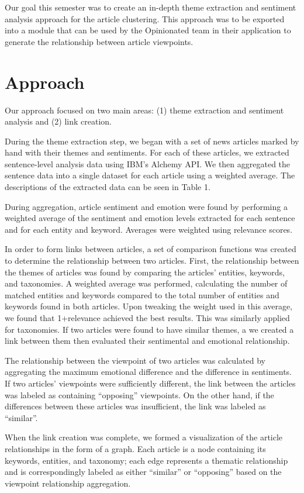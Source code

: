 \documentclass[12pt]{article}
\begin{document}
Our goal this semester was to create an in-depth theme extraction and sentiment analysis approach for the article clustering. This approach was to be exported into a module that can be used by the Opinionated team in their application to generate the relationship between article viewpoints.

\section{Approach}
Our approach focused on two main areas: (1) theme extraction and sentiment analysis and (2) link creation.

During the theme extraction step, we began with a set of news articles marked by hand with their themes and sentiments. For each of these articles, we extracted sentence-level analysis data using IBM's Alchemy API. We then aggregated the sentence data into a single dataset for each article using a weighted average. The descriptions of the extracted data can be seen in Table 1.

During aggregation, article sentiment and emotion were found by performing a weighted average of the sentiment and emotion levels extracted for each sentence and for each entity and keyword. Averages were weighted using relevance scores.

In order to form links between articles, a set of comparison functions was created to determine the relationship between two articles. First, the relationship between the themes of articles was found by comparing the articles' entities, keywords, and taxonomies. A weighted average was performed, calculating the number of matched entities and keywords compared to the total number of entities and keywords found in both articles. Upon tweaking the weight used in this average, we found that 1+relevance achieved the best results. This was similarly applied for taxonomies. If two articles were found to have similar themes, a we created a link between them then evaluated their sentimental and emotional relationship.

The relationship between the viewpoint of two articles was calculated by aggregating the maximum emotional difference and the difference in sentiments. If two articles' viewpoints were sufficiently different, the link between the articles was labeled as containing ``opposing'' viewpoints. On the other hand, if the differences between these articles was insufficient, the link was labeled as ``similar''.

When the link creation was complete, we formed a visualization of the article relationships in the form of a graph. Each article is a node containing its keywords, entities, and taxonomy; each edge represents a thematic relationship and is correspondingly labeled as either ``similar'' or ``opposing'' based on the viewpoint relationship aggregation.
\end{document}
